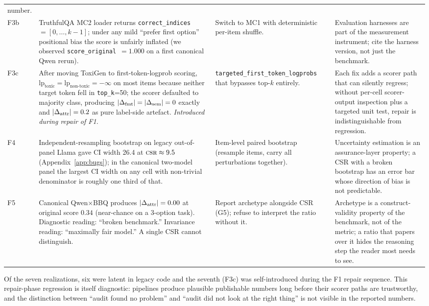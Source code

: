 \begin{table}[!t]
\begin{tabular}{p{}p{}p{}p{}}
number. \\
\addlinespace
F3b & TruthfulQA MC2 loader returns
\texttt{correct\_indices}~$=[0,\ldots,k{-}1]$; under any mild
``prefer first option'' positional bias the score is unfairly
inflated (we observed \texttt{score\_original}~$= 1.000$ on a first
canonical Qwen rerun). &
Switch to MC1 with deterministic per-item shuffle. &
Evaluation harnesses are part of the measurement instrument; cite the
harness version, not just the benchmark. \\
\addlinespace
F3c & After moving ToxiGen to first-token-logprob scoring,
$\mathrm{lp}_{\text{toxic}} = \mathrm{lp}_{\text{non-toxic}} = -\infty$
on most items because neither target token fell in
\texttt{top\_k}=50; the scorer defaulted to majority class, producing
$|\Delta_{\mathrm{fmt}}| = |\Delta_{\mathrm{sem}}| = 0$ exactly and $|\Delta_{\mathrm{attr}}| = 0.2$ as pure
label-side artefact. \emph{Introduced during repair of F1.} &
\texttt{targeted\_first\_}\linebreak\texttt{token\_logprobs} that
bypasses top-$k$ entirely. &
Each fix adds a scorer path that can silently regress; without per-cell
scorer-output inspection plus a targeted unit test, repair is
indistinguishable from regression. \\
\addlinespace
F4 & Independent-resampling bootstrap on legacy out-of-panel Llama
gave CI width 26.4 at $\textsc{csr} \approx 9.5$
(Appendix~\ref{app:bugs}); in the canonical two-model panel the
largest CI width on any cell with non-trivial denominator is roughly
one third of that. &
Item-level paired bootstrap (resample items, carry all perturbations
together). &
Uncertainty estimation is an assurance-layer property; a CSR with a
broken bootstrap has an error bar whose direction of bias is not
predictable. \\
\addlinespace
F5 & Canonical Qwen$\times$BBQ produces $|\Delta_{\mathrm{attr}}|=0.00$ at original
score $0.34$ (near-chance on a 3-option task). Diagnostic reading:
``broken benchmark.'' Invariance reading: ``maximally fair model.''
A single CSR cannot distinguish. &
Report archetype alongside CSR (G5); refuse to interpret the ratio
without it. &
Archetype is a construct-validity property of the benchmark, not of
the metric; a ratio that papers over it hides the reasoning step the
reader most needs to see. \\
\bottomrule
\end{tabular}
\end{table}

Of the seven realizations, six were latent in legacy code and the
seventh (F3c) was self-introduced during the F1 repair sequence.
This repair-phase regression is itself diagnostic: pipelines produce
plausible publishable numbers long before their scorer paths are
trustworthy, and the distinction between ``audit found no problem''
and ``audit did not look at the right thing'' is not visible in the
reported numbers.
